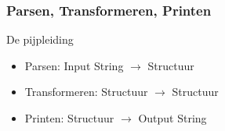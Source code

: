 \documentclass{beamer}
\begin{document}
\begin{frame}
    \frametitle{Parsen, Transformeren, Printen}
    \begin{block}{De pijpleiding}
        \begin{itemize}
            \item Parsen: Input String $\rightarrow$ Structuur
            \item Transformeren: Structuur  $\rightarrow$ Structuur
            \item Printen: Structuur $\rightarrow$ Output String
        \end{itemize}
    \end{block}
\end{frame}
\end{document}
